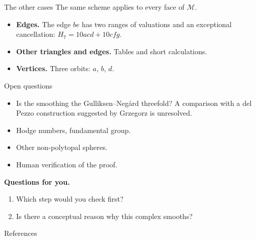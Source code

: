 \begin{frame}{The other cases}
The same scheme applies to every face of \(\mathcal M\).
\begin{itemize}
\setlength{\itemsep}{12pt}
\item \textbf{Edges.} The edge \(be\) has two ranges of valuations and an exceptional cancellation: \(H_7=10acd+10cfg\).
\item \textbf{Other triangles and edges.} Tables and short calculations.
\item \textbf{Vertices.} Three orbits: \(a\), \(b\), \(d\).
\end{itemize}
\end{frame}

\begin{frame}{Open questions}
\begin{itemize}
\setlength{\itemsep}{12pt}
\item Is the smoothing the Gulliksen--Negård threefold? A comparison with a del Pezzo construction suggested by Grzegorz is unresolved.
\item Hodge numbers, fundamental group.
\item Other non-polytopal spheres.
\item Human verification of the proof.
\end{itemize}
\par\bigskip
\textbf{Questions for you.}
\begin{enumerate}
\item Which step would you check first?
\item Is there a conceptual reason why this complex smooths?
\end{enumerate}
\end{frame}

\begin{frame}[allowframebreaks]{References}
\printbibliography[heading=none]
\end{frame}

